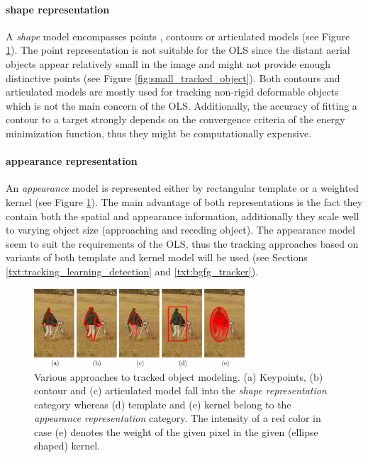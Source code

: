 \paragraph{shape representation} 
A \textit{shape} model encompasses points \cite{Tomasi91detectionand}, contours \cite{Kass88snakes:active, ActiveContour-BasedVisualTracking} or articulated models \cite{Delamarre2001328, conf/isvc/MigniotA13} (see Figure \ref{fig:object_models}). The point representation is not suitable for the OLS since the distant aerial objects appear relatively small in the image and might not provide enough distinctive points (see Figure \ref{fig:small_tracked_object}). Both contours and articulated models are mostly used for tracking non-rigid deformable objects which is not the main concern of the OLS. Additionally, the accuracy of fitting a contour to a target strongly depends on the convergence criteria of the energy minimization function, thus they might be computationally expensive.

\paragraph{appearance representation} 
An \textit{appearance} model is represented either by rectangular template \cite{ProbabilisticVisualTrackingTemplate, ObjectTrackinginMonochromaticVideo} or a weighted kernel \cite{Comaniciu:2003:KOT:776753.776799, MultipleCollaborativeKernelTracking} (see Figure \ref{fig:object_models}). The main advantage of both representations is the fact they contain both the spatial and appearance information, additionally they scale well to varying object size (approaching and receding object). The appearance model seem to suit the requirements of the OLS, thus the tracking approaches based on variants of both template and kernel model will be used (see Sections \ref{txt:tracking_learning_detection} and \ref{txt:bgfg_tracker}).

\begin{figure}[tbh]
	\centering
	\includegraphics[width=0.7\textwidth]{fig/object_model.pdf}
	\caption{Various approaches to tracked object modeling. (a) Keypoints, (b) contour and (c) articulated model fall into the \textit{shape representation} category whereas (d) template and (e) kernel belong to the \textit{appearance representation} category. The intensity of a red color in case (e) denotes the weight of the given pixel in the given (ellipse shaped) kernel.}
	\label{fig:object_models}
\end{figure}

